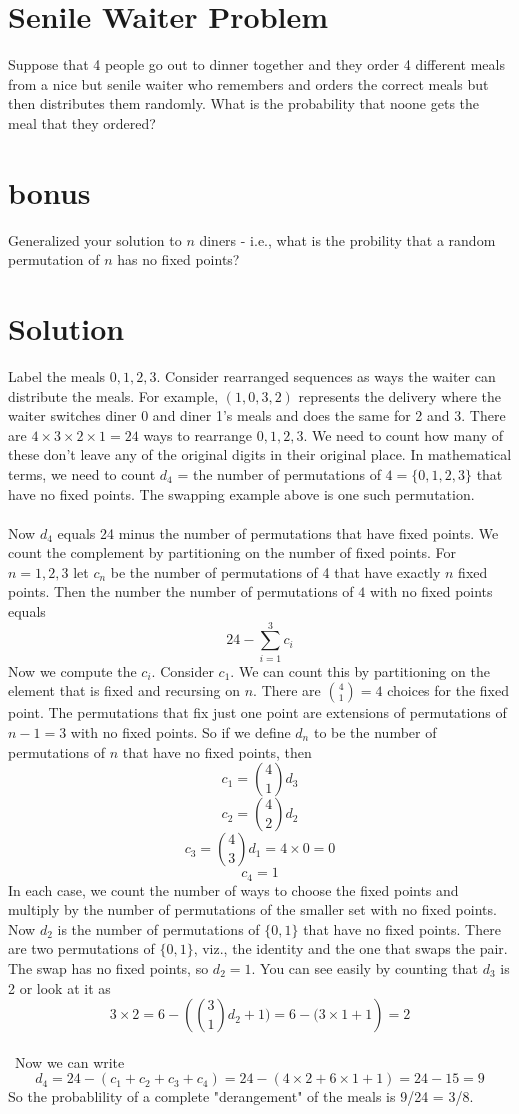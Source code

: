 \documentclass[11pt,a4paper]{report}
\theoremstyle{plain}
\theoremstyle{definition}
\theoremstyle{remark}
\begin{document}
\section*{Senile Waiter Problem}
Suppose that 4 people go out to dinner together and they order 4 different meals from a nice but senile waiter who remembers and orders the correct meals but then distributes them randomly.  What is the probability that noone gets the meal that they ordered?

\section*{bonus}
Generalized your solution to $n$ diners - i.e., what is the probility that a random permutation of $n$ has no fixed points?

\newpage
\section*{Solution}
Label the meals $0,1,2,3$.  Consider rearranged sequences as ways the waiter can distribute the meals.  For example, $(1,0,3,2)$ represents the delivery where the waiter switches diner 0 and diner 1's meals and does the same for 2 and 3.  There are $4\times3\times2\times1= 24$ ways to rearrange $0,1,2,3$.  We need to count how many of these don't leave any of the original digits in their original place.  In mathematical terms, we need to count $d_4$ = the number of permutations of $4 = \{0, 1, 2, 3\}$ that have no fixed points.  The swapping example above is one such permutation. 
\\\\
Now $d_4$ equals  24 minus the number of permutations that have fixed points. We count the complement by partitioning on the number of fixed points.  For $n = 1, 2, 3$ let $c_n$ be the number of permutations of 4 that have exactly $n$ fixed points.  Then the number the number of permutations of $4$ with no fixed points equals $$ 24 - \sum_{i=1}^{3}{c_i}$$
Now we compute the $c_i$.  Consider $c_{1}$.  We can count this by partitioning on the element that is fixed and recursing on $n$.  There are $ \binom{4}{1} = 4$ choices for the fixed point.  The permutations that fix just one point are extensions of permutations of $n - 1 = 3$ with no fixed points.  So if we define $d_n$ to be the number of permutations of $n$ that have no fixed points, then 
$$c_{1} =  \binom{4}{1} d_{3}$$
$$c_{2} = \binom{4}{2} d_{2}$$
$$c_{3} = \binom{4}{3} d_{1} = 4 \times 0 = 0$$
$$c_{4} = 1$$
In each case, we count the number of ways to choose the fixed points and multiply by the number of permutations of the smaller set with no fixed points.  Now $d_{2}$ is the number of permutations of $\{0,1\}$ that have no fixed points.  There are two permutations of  $\{0,1\}$, viz., the identity and the one that swaps the pair.  The swap has no fixed points, so $d_{2} = 1$.  You can see easily by counting that $d_{3}$ is 2 or look at it as $$3\times2 =6 - ({\binom{3}{1} d_{2}+ 1) =  6 -({3} \times{1}+ 1} ) = 2$$
\\\
Now we can write $$d_4 = 24 - (c_1 + c_2 + c_3 + c_4) = 24 - (4 \times 2 + 6 \times 1 + 1) = 24 - 15 = 9$$
So the probablility of a complete "derangement" of the meals is 9/24 = 3/8.
\end{document}
